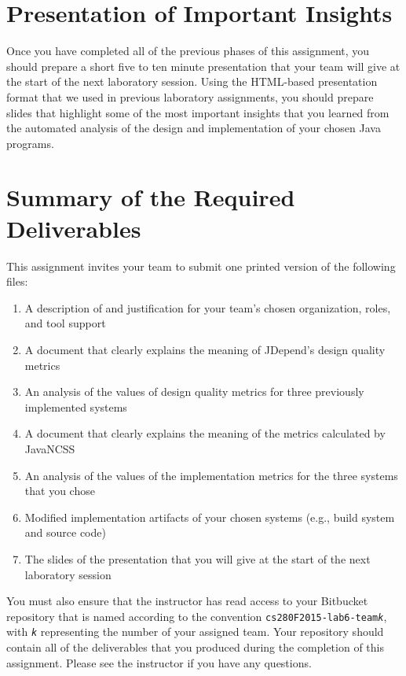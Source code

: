 \section*{Presentation of Important Insights}

Once you have completed all of the previous phases of this assignment, you should prepare a short five to ten minute
presentation that your team will give at the start of the next laboratory session. Using the HTML-based presentation
format that we used in previous laboratory assignments, you should prepare slides that highlight some of the most
important insights that you learned from the automated analysis of the design and implementation of your chosen Java programs.

\section*{Summary of the Required Deliverables}

This assignment invites your team to submit one printed version of the following files:
\vspace*{-.1in}
\begin{enumerate}
	\itemsep0em
	\item A description of and justification for your team's chosen organization, roles, and tool support
	\item A document that clearly explains the meaning of JDepend's design quality metrics
	\item An analysis of the values of design quality metrics for three previously implemented systems
	\item A document that clearly explains the meaning of the metrics calculated by JavaNCSS
	\item An analysis of the values of the implementation metrics for the three systems that you chose
	\item Modified implementation artifacts of your chosen systems (e.g., build system and source code)
	\item The slides of the presentation that you will give at the start of the next laboratory session
\end{enumerate}
\vspace*{-.1in}

You must also ensure that the instructor has read access to your Bitbucket repository that is named according to the
convention {\tt cs280F2015-lab6-team{\em k}}, with {\tt {\em k}} representing the number of your assigned team.  Your
repository should contain all of the deliverables that you produced during the completion of this assignment.  Please
see the instructor if you have any questions.


